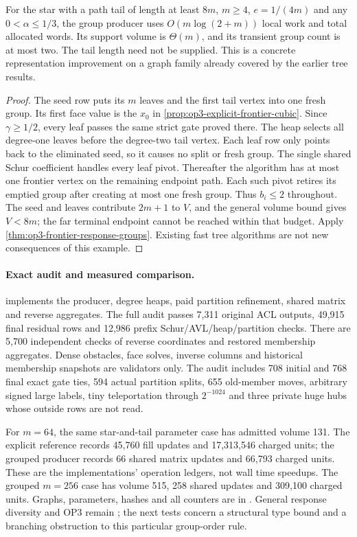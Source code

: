 \begin{proposition}
\label{prop:op3-grouped-star-tail}
For the star with a path tail of length at least $8m$, $m\geq4$,
$e=1/(4m)$ and any $0<\alpha\leq1/3$, the group producer uses
$O(m\log(2+m))$ local work and total allocated words. Its support volume
is $\Theta(m)$, and its transient group count is at most two. The tail
length need not be supplied. This is a concrete representation improvement
on a graph family already covered by the earlier tree results.
\end{proposition}
\begin{proof}
The seed row puts its $m$ leaves and the first tail vertex into one fresh
group. Its first face value is the $x_0$ in
\cref{prop:op3-explicit-frontier-cubic}. Since $\gamma\geq1/2$, every leaf
passes the same strict gate proved there. The heap selects all degree-one
leaves before the degree-two tail vertex. Each leaf row only points back to
the eliminated seed, so it causes no split or fresh group. The single
shared Schur coefficient handles every leaf pivot. Thereafter the algorithm
has at most one frontier vertex on the remaining endpoint path. Each such
pivot retires its emptied group after creating at most one fresh group.
Thus $b_i\leq2$ throughout. The seed and leaves contribute $2m+1$ to
$V$, and the general volume bound gives $V<8m$; the far terminal endpoint
cannot be reached within that budget. Apply
\cref{thm:op3-frontier-response-groups}. Existing fast tree algorithms are
not new consequences of this example.
\end{proof}

\paragraph{Exact audit and measured comparison.}
 implements the producer, degree heaps, paid
partition refinement, shared matrix and reverse aggregates. The full audit
passes 7,311 original ACL outputs, 49,915 final residual rows and 12,986
prefix Schur/AVL/heap/partition checks. There are 5,700 independent checks
of reverse coordinates and restored membership aggregates. Dense obstacles,
face solves, inverse columns and historical membership snapshots are
validators only. The audit includes 708 initial and 768 final exact gate
ties, 594 actual partition splits, 655 old-member moves, arbitrary signed
large labels, tiny teleportation through $2^{-1024}$ and three private
huge hubs whose outside rows are not read.

For $m=64$, the same star-and-tail parameter case has admitted volume 131.
The explicit reference records 45,760 fill updates and 17,313,546 charged
units; the grouped producer records 66 shared matrix updates and 66,793
charged units. These are the implementations' operation ledgers, not wall
time speedups. The grouped $m=256$ case has volume 515, 258 shared updates
and 309,100 charged units. Graphs, parameters, hashes and all counters are
in . General response diversity and OP3
remain \statusopen; the next tests concern a structural type bound and a
branching obstruction to this particular group-order rule.
